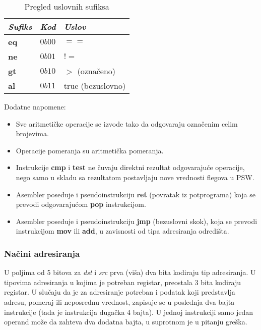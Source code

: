 \begin{table}[h!]
\centering
\small

    \begin{tabu}{ | X[l] | X[l] | X[l] | }
        \hline
        \textbf{\textit{Sufiks}} &
        \textbf{\textit{Kod}} &
        \textbf{\textit{Uslov}} \\
        \hline
        \hline

        \textbf{eq} & $0b00$ & $==$ \\
        \hline

        \textbf{ne} & $0b01$ & $!=$ \\
        \hline

        \textbf{gt} & $0b10$ & $>$ (označeno) \\
        \hline

        \textbf{al} & $0b11$ & true (bezuslovno) \\
        \hline
    \end{tabu}
    \caption{Pregled uslovnih sufiksa}
    \label{table:2}

\end{table}

\noindent Dodatne napomene:
\begin{itemize}
    \item Sve aritmetičke operacije se izvode tako da odgovaraju označenim
          celim brojevima.
    \item Operacije pomeranja su aritmetička pomeranja.
    \item Instrukcije \textbf{cmp} i \textbf{test} ne čuvaju direktni rezultat
          odgovarajuće opera\-cije, nego samo u skladu sa rezultatom postavljaju
          nove vrednosti flegova u PSW.
    \item Asembler poseduje i pseudoinstrukciju \textbf{ret} (povratak
          iz potprograma) koja se prevodi odgovarajućom \textbf{pop}
          instrukcijom.
    \item Asembler poseduje i pseudoinstrukciju \textbf{jmp} (bezuslovni
          skok), koja se prevodi instrukcijom \textbf{mov} ili \textbf{add},
          u zavisnosti od tipa adresiranja odredišta.
\end{itemize}

\subsubsection{Načini adresiranja}

U poljima od 5 bitova za \textit{dst} i \textit{src} prva (viša)
dva bita kodiraju tip adresiranja. U tipovima adresiranja u kojima je potreban
registar, preostala 3 bita kodira\-ju registar. U slučaju da je za adresiranje
potreban i podatak koji predstavlja adresu, pomeraj ili neposrednu vrednost,
zapisuje se u poslednja dva bajta instrukcije (tada je instrukcija dugačka
4 bajta). U jednoj instrukciji samo jedan operand može da zahteva dva
dodatna bajta, u suprotnom je u pitanju greška.

